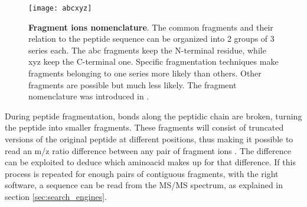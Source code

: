 \begin{figure}[!h]
\centering
\texttt{[image: abcxyz]}
\caption[Fragment ions nomenclature]{\textbf{Fragment ions nomenclature}. The common fragments and their relation to the peptide sequence can be organized into 2 groups of 3 series each. The abc fragments keep the N-terminal residue, while xyz keep the C-terminal one. Specific fragmentation techniques make fragments belonging to one series more likely than others. Other fragments are possible but much less likely. The fragment nomenclature was introduced in \cite{Roepstorff1984}.}
\label{fig:abcxyz}
\end{figure}


During peptide fragmentation, bonds along the peptidic chain are broken, turning the peptide into smaller fragments. These fragments will consist of truncated versions of the original peptide at different positions, thus making it possible to read an \ac{m/z} ratio difference between any pair of fragment ions \cite{Barsnes2008}. The difference can be exploited to deduce which aminoacid makes up for that difference. If this process is repeated for enough pairs of contiguous fragments, with the right software, a sequence can be read from the \ac{MS/MS} spectrum, as  explained in section \ref{sec:search_engines}.




%
%
 
